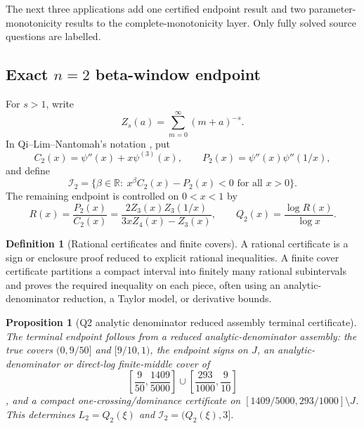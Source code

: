 \documentclass[11pt]{article}
\numberwithin{equation}{section}
\newtheorem{proposition}[theorem]{Proposition}
\theoremstyle{definition}
\newtheorem{definition}{Definition}[section]
\theoremstyle{remark}
\newcommand{\1}{\mathbf 1}
\begin{document}
The next three applications add one certified endpoint result and two parameter-monotonicity results to the complete-monotonicity layer.  Only fully solved source questions are labelled.

\subsection{Exact \(n=2\) beta-window endpoint}

For \(s>1\), write
\begin{equation}
\label{eq:q2-zs-definition}
Z_s(a)=\sum_{m=0}^\infty (m+a)^{-s}.
\end{equation}
In Qi--Lim--Nantomah's notation \cite{qi-lim-nantomah-polygamma}, put
\begin{equation}
\label{eq:q2-cp-definition}
C_2(x)=\psi''(x)+x\psi^{(3)}(x),
\qquad
P_2(x)=\psi''(x)\psi''(1/x),
\end{equation}
and define
\begin{equation}
\label{eq:q2-beta-window}
\mathcal I_2=
\{\beta\in\mathbb R:\ x^\beta C_2(x)-P_2(x)<0\text{ for all }x>0\}.
\end{equation}
The remaining endpoint is controlled on \(0<x<1\) by
\begin{equation}
\label{eq:q2-ratio-q}
R(x)=\frac{P_2(x)}{C_2(x)}
=\frac{2Z_3(x)Z_3(1/x)}{3xZ_4(x)-Z_3(x)},
\qquad
Q_2(x)=\frac{\log R(x)}{\log x}.
\end{equation}

\begin{definition}[Rational certificates and finite covers]
\label{res:rational-certificate-and-finite-cover-language}
A rational certificate is a sign or enclosure proof reduced to explicit rational inequalities. A finite cover certificate partitions a compact interval into finitely many rational subintervals and proves the required inequality on each piece, often using an analytic-denominator reduction, a Taylor model, or derivative bounds.
\end{definition}

\begin{proposition}[Q2 analytic denominator reduced assembly terminal certificate]
\label{res:q2-analytic-denominator-reduced-assembly-terminal-certificate}
The terminal endpoint follows from a reduced analytic-denominator assembly: the true covers \((0,9/50]\) and \([9/10,1)\), the endpoint signs on \(J\), an analytic-denominator or direct-log finite-middle cover of
\[
\left[\frac{9}{50},\frac{1409}{5000}\right]
\cup
\left[\frac{293}{1000},\frac{9}{10}\right]
\],
and a compact one-crossing/dominance certificate on \([1409/5000,293/1000]\setminus J\). This determines \(L_2=Q_2(\xi)\) and \(\mathcal I_2=(Q_2(\xi),3]\).
\end{proposition}
\end{document}
